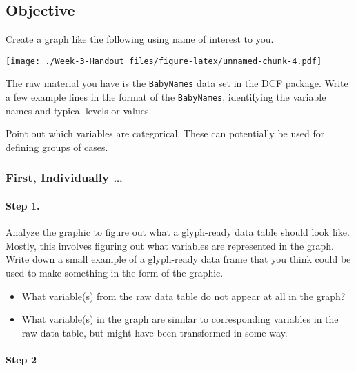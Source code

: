 \documentclass[]{article}
\begin{document}
\begin{multicols}{2}

\subsection{Objective}\label{objective}

Create a graph like the following using name of interest to you.

\texttt{[image: ./Week-3-Handout\_files/figure-latex/unnamed-chunk-4.pdf]}

The raw material you have is the \texttt{BabyNames} data set in the DCF
package. Write a few example lines in the format of the
\texttt{BabyNames}, identifying the variable names and typical levels or
values.

\vspace*{1.5in}

Point out which variables are categorical. These can potentially be used
for defining groups of cases.

\subsubsection{First, Individually \ldots{}}\label{first-individually}

\paragraph{Step 1.}\label{step-1.}

Analyze the graphic to figure out what a glyph-ready data table should
look like. Mostly, this involves figuring out what variables are
represented in the graph. Write down a small example of a glyph-ready
data frame that you think could be used to make something in the form of
the graphic.

\vspace*{1.5in}

\begin{itemize}
\itemsep1pt\parskip0pt
\item
  What variable(s) from the raw data table do not appear at all in the
  graph?
\item
  What variable(s) in the graph are similar to corresponding variables
  in the raw data table, but might have been transformed in some way.
\end{itemize}

\paragraph{Step 2}\label{step-2}


\end{multicols}
\end{document}
